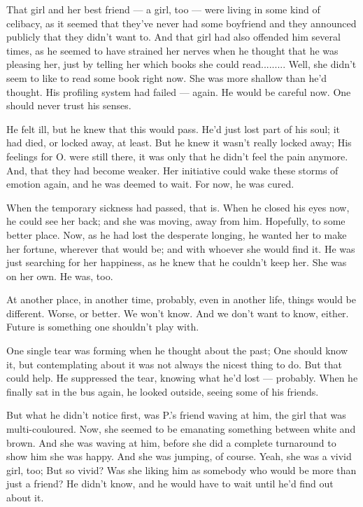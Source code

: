 That girl and her best friend --- a girl, too --- were living in some kind of celibacy, as it seemed that they've never had some boyfriend and they announced publicly that they didn't want to. 
And that girl had also offended him several times, as he seemed to have strained her nerves when he thought that he was pleasing her, just by telling her which books she could read.........
Well, she didn't seem to like to read some book right now. 
She was more shallow than he'd thought. 
His profiling system had failed --- again. 
He would be careful now. 
One should never trust his senses.

He felt ill, but he knew that this would pass. 
He'd just lost part of his soul; it had died, or locked away, at least. 
But he knew it wasn't really locked away; His feelings for O. were still there, it was only that he didn't feel the pain anymore. 
And, that they had become weaker. 
Her initiative could wake these storms of emotion again, and he was deemed to wait. 
For now, he was cured.

When the temporary sickness had passed, that is. 
When he closed his eyes now, he could see her back; and she was moving, away from him. 
Hopefully, to some better place. 
Now, as he had lost the desperate longing, he wanted her to make her fortune, wherever that would be; and with whoever she would find it. 
He was just searching for her happiness, as he knew that he couldn't keep her. 
She was on her own. 
He was, too.

At another place, in another time, probably, even in another life, things would be different. 
Worse, or better. 
We won't know. 
And we don't want to know, either. 
Future is something one shouldn't play with. 

One single tear was forming when he thought about the past; One should know it, but contemplating about it was not always the nicest thing to do. 
But that could help. 
He suppressed the tear, knowing what he'd lost --- probably. 
When he finally sat in the bus again, he looked outside, seeing some of his friends. 

But what he didn't notice first, was P.'s friend waving at him, the girl that was multi-couloured. Now, she seemed to be emanating something between white and brown. 
And she was waving at him, before she did a complete turnaround to show him she was happy. 
And she was jumping, of course. 
Yeah, she was a vivid girl, too; But so vivid?
Was she liking him as somebody who would be more than just a friend?
He didn't know, and he would have to wait until he'd find out about it. 

